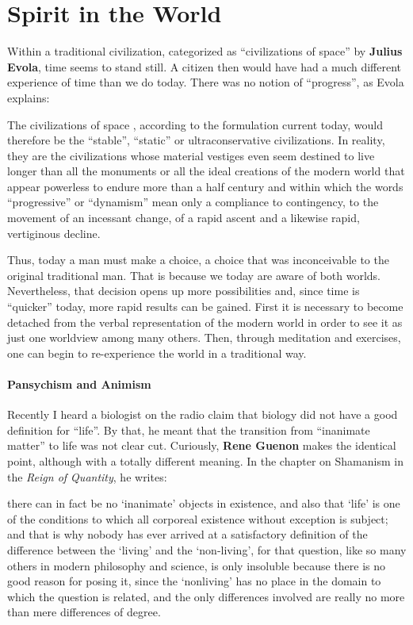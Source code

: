 \section{Spirit in the World}

Within a traditional civilization, categorized as ``civilizations of space'' by \textbf{Julius Evola}, time seems to stand still. A citizen then would have had a much different experience of time than we do today. There was no notion of ``progress'', as Evola explains:

\begin{quotex} 
The civilizations of space , according to the formulation current today, would therefore be the ``stable'', ``static'' or ultraconservative civilizations. In reality, they are the civilizations whose material vestiges even seem destined to live longer than all the monuments or all the ideal creations of the modern world that appear powerless to endure more than a half century and within which the words ``progressive'' or ``dynamism'' mean only a compliance to contingency, to the movement of an incessant change, of a rapid ascent and a likewise rapid, vertiginous decline.
\end{quotex}


Thus, today a man must make a choice, a choice that was inconceivable to the original traditional man. That is because we today are aware of both worlds. Nevertheless, that decision opens up more possibilities and, since time is ``quicker'' today, more rapid results can be gained. First it is necessary to become detached from the verbal representation of the modern world in order to see it as just one worldview among many others. Then, through meditation and exercises, one can begin to re-experience the world in a traditional way.

\paragraph{Pansychism and Animism}


Recently I heard a biologist on the radio claim that biology did not have a good definition for ``life''. By that, he meant that the transition from ``inanimate matter'' to life was not clear cut. Curiously, \textbf{Rene Guenon} makes the identical point, although with a totally different meaning. In the chapter on Shamanism in the \emph{Reign of Quantity}, he writes:


\begin{quotex}
there can in fact be no `inanimate' objects in existence, and also that `life' is one of the conditions to which all corporeal existence without exception is subject; and that is why nobody has ever arrived at a satisfactory definition of the difference between the `living' and the `non-living', for that question, like so many others in modern philosophy and science, is only insoluble because there is no good reason for posing it, since the `nonliving' has no place in the domain to which the question is related, and the only differences involved are really no more than mere differences of degree.
\end{quotex}


